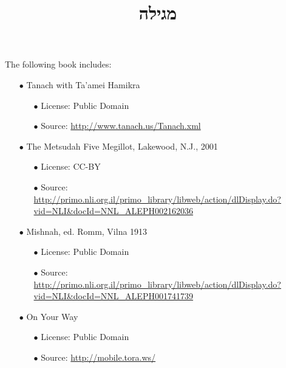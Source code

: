 \documentclass[12pt, openany]{book}
\newcommand{\texttitle}{מגילה}\usepackage{titlesec}
\begin{document}
\frontmatter
{}

\newcommand{\oneline}[1]{%
	\newdimen{\namewidth}%
	\setlength{\namewidth}{\widthof{#1}}%
	\ifthenelse{\lengthtest{\namewidth < \textwidth}}%
	{#1}%
	{\resizebox{\textwidth}{!}{#1}}%
}

\title{\oneline{\hspace*{0.5in}\texttitle\hspace*{0.5in}}}

\author{}

\date{}

\maketitle

\begin{minipage}[b][\textheight][b]{\textwidth}\englishfont\footnotesize
	\begin{english}
		\vfill
		The following book includes:
\begin{itemize}
\item[$\bullet$] Tanach with Ta'amei Hamikra
\begin{itemize}
\item[$\bullet$] License: Public Domain
\item[$\bullet$] Source: \url{http://www.tanach.us/Tanach.xml}
\end{itemize}
\item[$\bullet$] The Metsudah Five Megillot, Lakewood, N.J., 2001
\begin{itemize}
\item[$\bullet$] License: CC-BY
\item[$\bullet$] Source: \url{http://primo.nli.org.il/primo_library/libweb/action/dlDisplay.do?vid=NLI&docId=NNL_ALEPH002162036}
\end{itemize}
\item[$\bullet$] Mishnah, ed. Romm, Vilna 1913
\begin{itemize}
\item[$\bullet$] License: Public Domain
\item[$\bullet$] Source: \url{http://primo.nli.org.il/primo_library/libweb/action/dlDisplay.do?vid=NLI&docId=NNL_ALEPH001741739}
\end{itemize}
\item[$\bullet$] On Your Way
\begin{itemize}
\item[$\bullet$] License: Public Domain
\item[$\bullet$] Source: \url{http://mobile.tora.ws/}

\end{itemize}
\end{itemize}
\end{english}
\end{minipage}
\end{document}

